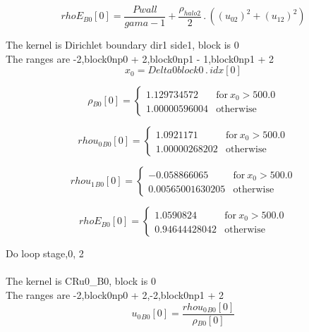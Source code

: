 \documentclass{article}
\begin{document}
\begin{dmath}{rhoE{_{B0}}}[{0}] = \frac{Pwall}{gama - 1} + \frac{\rho_{halo 2}}{2} \,.\, \left(\left(u_{02} \right)^{2} + \left(u_{12} \right)^{2}\right)\end{dmath}

\noindent The kernel is Dirichlet boundary dir1 side1, block is 0\\\noindent The ranges are -2,block0np0 + 2,block0np1 - 1,block0np1 + 2\\\begin{dmath}x_{0} = Delta0block0 \,.\, {idx}[{0}]\end{dmath}

\begin{dmath}{\rho{_{B0}}}[{0}] = \begin{cases} 1.129734572 & \text{for}\: x_{0} > 500.0 \\1.00000596004 & \text{otherwise} \end{cases}\end{dmath}

\begin{dmath}{rhou_{0}{_{B0}}}[{0}] = \begin{cases} 1.0921171 & \text{for}\: x_{0} > 500.0 \\1.00000268202 & \text{otherwise} \end{cases}\end{dmath}

\begin{dmath}{rhou_{1}{_{B0}}}[{0}] = \begin{cases} -0.058866065 & \text{for}\: x_{0} > 500.0 \\0.00565001630205 & \text{otherwise} \end{cases}\end{dmath}

\begin{dmath}{rhoE{_{B0}}}[{0}] = \begin{cases} 1.0590824 & \text{for}\: x_{0} > 500.0 \\0.94644428042 & \text{otherwise} \end{cases}\end{dmath}

\noindent Do loop stage,0, 2\\
\\\noindent The kernel is CRu0_B0, block is 0\\\noindent The ranges are -2,block0np0 + 2,-2,block0np1 + 2\\\begin{dmath}{u_{0}{_{B0}}}[{0}] = \frac{{rhou_{0}{_{B0}}}[{0}]}{{\rho{_{B0}}}[{0}]}\end{dmath}
\end{document}

